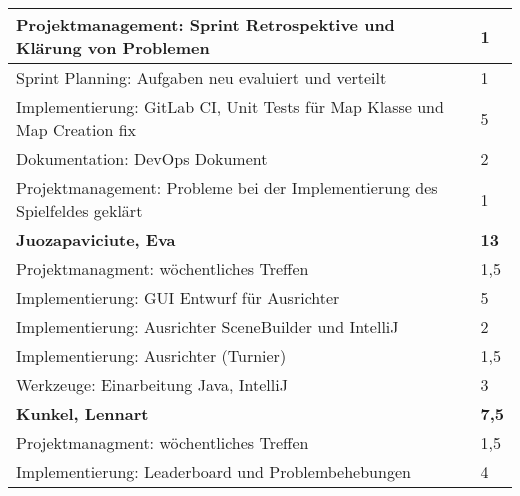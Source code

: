 \documentclass[a4paper,11pt]{scrartcl}
\begin{document}
\begin{longtable}{| p{13.8cm} | C{2.4cm} |}
	Projektmanagement: Sprint Retrospektive und Klärung von Problemen
	&
	1
	\\
	\hline

	Sprint Planning: Aufgaben neu evaluiert und verteilt
	&
	1
	\\
	\hline

	Implementierung: GitLab CI, Unit Tests für Map Klasse und Map Creation fix
	&
	5
	\\
	\hline

  Dokumentation: DevOps Dokument
	&
  2
	\\
	\hline

  Projektmanagement: Probleme bei der Implementierung des Spielfeldes geklärt
	&
  1
	\\
	\hline
	\hline


	\textbf{Juozapaviciute, Eva} & \textbf{13}\\ %
	\hline

  Projektmanagment: wöchentliches Treffen
	&
  1,5
	\\
	\hline

  Implementierung: GUI Entwurf für Ausrichter
	&
  5
	\\
	\hline

  Implementierung: Ausrichter SceneBuilder und IntelliJ
	&
  2
	\\
	\hline

  Implementierung: Ausrichter (Turnier)
	&
  1,5
	\\
	\hline
	
  Werkzeuge: Einarbeitung Java, IntelliJ
	&
  3
	\\
	\hline
	\hline


	\textbf{Kunkel, Lennart} & \textbf{7,5}\\ %
	\hline

  Projektmanagment: wöchentliches Treffen
	&
  1,5
	\\
	\hline

  Implementierung: Leaderboard und Problembehebungen
	&
  4
	\\
	\hline


\end{longtable}
\end{document}

